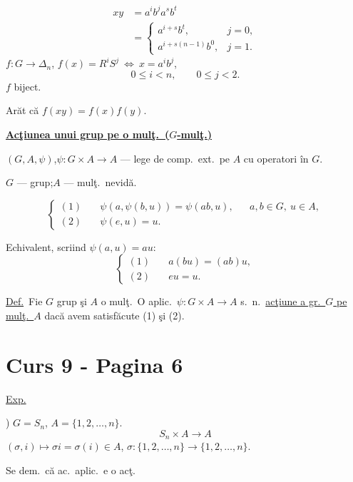 \[
\begin{aligned}
xy&=a^i b^j a^s b^t\\
  &=\begin{cases}
      a^{i+s}b^t, & j=0,\\[2pt]
      a^{i+s(n-1)}b^0, & j=1.
    \end{cases}
\end{aligned}
\]
\bigskip
\noindent $f:G\longrightarrow\Delta_n$,\quad
$f(x)=R^iS^j\ \Longleftrightarrow\ x=a^i b^j$,
\[
0\leq i<n,\qquad 0\leq j<2.
\]
\noindent $f$ biject.

\noindent Arăt că $f(xy)=f(x)f(y)$.

\bigskip
\noindent\underline{\textbf{Acţiunea unui grup pe o mulţ.\ ($G$-mulţ.)}}

\bigskip
\noindent $(G,A,\psi)$,\quad $\psi:G\times A\longrightarrow A$ --- lege de comp.\ ext.\
pe $A$ cu operatori în $G$.

\noindent $G$ --- grup;\quad $A$ --- mulţ.\ nevidă.

\[
\left\{\begin{aligned}
(1)\quad &\psi(a,\psi(b,u))=\psi(ab,u), && a,b\in G,\ u\in A,\\
(2)\quad &\psi(e,u)=u.
\end{aligned}\right.
\]

\noindent Echivalent, scriind $\psi(a,u)=au$:
\[
\left\{\begin{aligned}
(1)\quad &a(bu)=(ab)u,\\
(2)\quad &eu=u.
\end{aligned}\right.
\]

\bigskip
\noindent\underline{Def.}\ Fie $G$ grup şi $A$ o mulţ.\ O aplic.\
$\psi:G\times A\longrightarrow A$ s.\ n.\ \underline{acţiune a gr.\ $G$ pe mulţ.\ $A$}
dacă avem satisfăcute (1) şi (2).





\section*{Curs 9 - Pagina 6}

\noindent\underline{Exp.}

) $G=S_n$, \qquad $A=\{1,2,\ldots,n\}$.
\[
S_n\times A\longrightarrow A
\]
\noindent $(\sigma,i)\longmapsto \sigma i=\sigma(i)\in A$, \qquad
$\sigma:\{1,2,\ldots,n\}\longrightarrow\{1,2,\ldots,n\}$.

\bigskip
\noindent Se dem.\ că ac.\ aplic.\ e o acţ.

